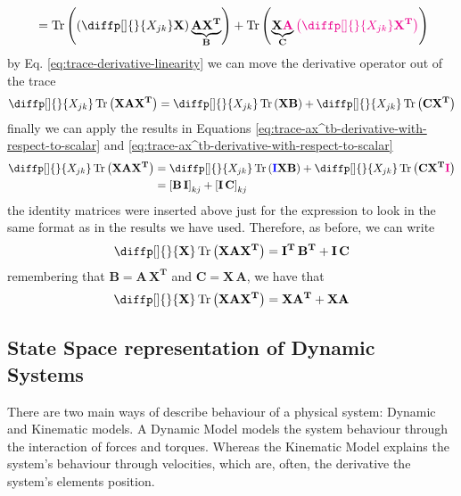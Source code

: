 \documentclass[12pt]{article}
\newcommand{\mat}[1]{\mathbf{#1}}
\newcommand{\brac}[1]{\left[#1\right]} %
\newcommand{\parentheses}[1]{\left(#1\right)}
\DeclareMathOperator{\Tr}{Tr}
\newcommand{\blue}[1]{\color{blue}#1\color{black}}
\newcommand{\magenta}[1]{\color{magenta}#1\color{black}}
\begin{document}
\begin{enumerate}
\begin{equation*}
\begin{aligned}
            &= \Tr\parentheses{\parentheses{\diffp[]{}{X_{jk}} \mat{X}} \underbrace{\mat{A X^T}}_{\mat{B}}} + \Tr\parentheses{\underbrace{\mat{X \magenta{A}}}_{\mat{C}}\magenta{\parentheses{\diffp[]{}{X_{jk}} \mat{X^T}}}}\\
        \end{aligned}
    \end{equation*}
    by Eq. \ref{eq:trace-derivative-linearity} we can move the derivative operator out of the trace
    \begin{equation*}
        \diffp[]{}{X_{jk}} \Tr\parentheses{\mat{X A X^T}} = \diffp[]{}{X_{jk}} \Tr\parentheses{\mat{X B}} + \diffp[]{}{X_{jk}}\Tr\parentheses{\mat{C X^T}}
    \end{equation*}
    finally we can apply the results in Equations \ref{eq:trace-ax^tb-derivative-with-respect-to-scalar} and \ref{eq:trace-ax^tb-derivative-with-respect-to-scalar}
    \begin{equation*}
        \begin{aligned}
        \diffp[]{}{X_{jk}} \Tr\parentheses{\mat{X A X^T}} &= \diffp[]{}{X_{jk}} \Tr\parentheses{\mat{\blue{I} X B}} + \diffp[]{}{X_{jk}}\Tr\parentheses{\mat{C X^T \magenta{I}}} \\
        &= \brac{\mat{B\,I}}_{kj} + \brac{\mat{I\,C}}_{kj}
        \end{aligned}
    \end{equation*}
    the identity matrices were inserted above just for the expression to look in the same format as in the results we have used. Therefore, as before, we can write
    \begin{equation*}
        \diffp[]{}{\mat{X}} \Tr\parentheses{\mat{X A X^T}} = \mat{I^T \, B^T} + \mat{I\, C}
    \end{equation*}
    remembering that $\mat{B} = \mat{A\,X^T}$ and $\mat{C} = \mat{X \, A}$, we have that
    \begin{equation}
        \diffp[]{}{\mat{X}} \Tr\parentheses{\mat{X A X^T}} = \mat{X A^T} + \mat{X A}
        \label{eq:trace-xax^t-derivative}
    \end{equation}
\end{enumerate}


\subsection{State Space representation of Dynamic Systems}
There are two main ways of describe behaviour of a physical system: Dynamic and Kinematic models. A Dynamic Model models the system behaviour through the interaction of forces and torques. Whereas the Kinematic Model explains the system's behaviour through velocities, which are, often, the derivative the system's elements position.
\end{document}
